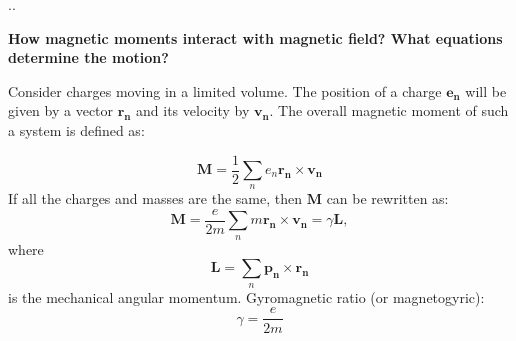 \documentclass[handout]{beamer}
\begin{document}
\begin{frame}[shrink=5]{\thesection.\thesubsection. \insertsubsection}
    
    \textbf{How magnetic moments interact with magnetic field? What equations determine the motion?}
	
	 Consider charges moving in a limited volume. The position of a charge $\bm{e_n}$ will be given by a vector $\bm{r_n}$ and its velocity by $\bm{v_n}$. The overall magnetic moment of such a system is defined as:
			
			\begin{equation}
			\bm{M} = \frac{1}{2} \sum_{n} e_n\bm{r_n} \times \bm{v_n}
			\end{equation}
	\onslide<3->
		If all the charges and masses are the same, then $\bm{M}$ can be rewritten as:	
			\begin{equation} \label{eq:1}
			\bm{M} = \frac{e}{2m} \sum_{n} m\bm{r_n} \times \bm{v_n} = \gamma \bm{L},
			\end{equation}
			where
			\begin{equation}
			\bm{L} = \sum_{n} \bm{p_n} \times \bm{r_n}
			\end{equation}
			is the mechanical angular momentum.
			\alert{Gyromagnetic ratio} (or magnetogyric): 
			\begin{equation}
			\gamma = \dfrac{e}{2m}
			\end{equation}
			


\end{frame}
\end{document}
